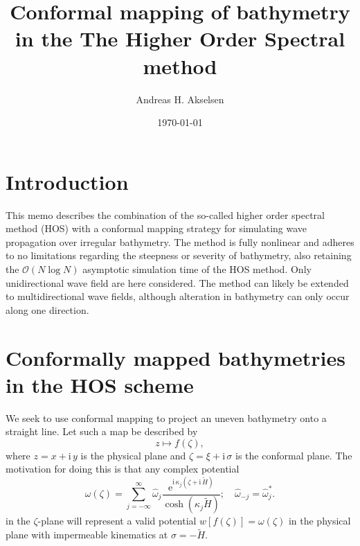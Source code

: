 \documentclass[internal]{sintefmemo}
\title{Conformal mapping of bathymetry in the The Higher Order Spectral method}
\author{Andreas H. Akselsen}
\date{\today}
\newcommand{\mr}{\mathrm}
\newcommand{\ii}{\mr{i}\,}
\newcommand{\ee}{\mr{e}}
\renewcommand{\_}[1]{_\mr{#1}}
\newcommand{\w}{w}
\newcommand{\h}{\hat}
\newcommand{\z}{z}
\newcommand{\x}{x}
\newcommand{\y}{y}
\newcommand{\zz}{\zeta}
\newcommand{\xx}{\xi}
\newcommand{\yy}{\sigma}
\newcommand{\kk}{\kappa}
\newcommand{\zmap}{f}
\newcommand{\ww}{\omega}
\renewcommand{\w}{w}
\begin{document}
\frontmatter

\tableofcontents

\section{Introduction}
This memo describes the combination of the so-called higher order spectral method (HOS) with a conformal mapping strategy for simulating wave propagation over irregular bathymetry.
The method is fully nonlinear and adheres to no limitations regarding the steepness or severity of bathymetry, also retaining the $\mathcal O(N\log N)$ asymptotic simulation time of the HOS method. 
Only unidirectional wave field are here considered. The method can likely be extended to multidirectional wave fields, although alteration in bathymetry can only occur along one direction.


\section{Conformally mapped bathymetries in the HOS scheme}
We seek to use conformal mapping to project an uneven bathymetry onto a straight line.
Let such a map be described by 
\begin{equation*}
	\z \mapsto \zmap(\zz),
\end{equation*}
where $\z = \x+\ii\y$ is the physical plane and $\zz=\xx+\ii\yy$ is the conformal plane. 
The motivation for doing this is that any complex potential 
\begin{equation}
\ww(\zz) = \sum_{j=-\infty}^\infty \h\ww_j \frac{\ee^{\ii \kk_j(\zz+\ii\tilde H)}}{\cosh(\kk_j \tilde H)}; \quad \h\ww_{-j}=\h\ww_{j}^*.
\label{eq:ww}
\end{equation}
in the $\zz$-plane will represent a valid potential $\w[\zmap(\zz)]=\ww(\zz)$ in the physical plane with impermeable kinematics at $\yy=-\tilde H$.
\\
\end{document}
